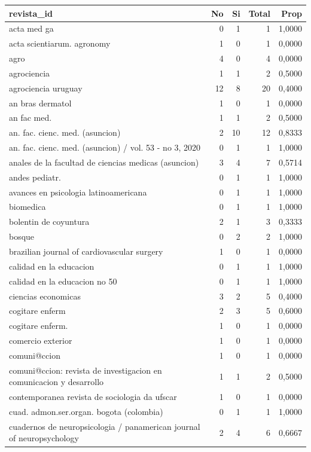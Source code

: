 \begin{longtable}{lrrrr}
\toprule
revista\_id & No & Si & Total & Prop\\
\midrule
acta med ga & 0 & 1 & 1 & 1,0000\\
acta scientiarum. agronomy & 1 & 0 & 1 & 0,0000\\
agro & 4 & 0 & 4 & 0,0000\\
agrociencia & 1 & 1 & 2 & 0,5000\\
agrociencia uruguay & 12 & 8 & 20 & 0,4000\\
an bras dermatol & 1 & 0 & 1 & 0,0000\\
an fac med. & 1 & 1 & 2 & 0,5000\\
an. fac. cienc. med. (asuncion) & 2 & 10 & 12 & 0,8333\\
an. fac. cienc. med. (asuncion) / vol. 53 - no 3, 2020 & 0 & 1 & 1 & 1,0000\\
anales de la facultad de ciencias medicas (asuncion) & 3 & 4 & 7 & 0,5714\\
andes pediatr. & 0 & 1 & 1 & 1,0000\\
avances en psicologia latinoamericana & 0 & 1 & 1 & 1,0000\\
biomedica & 0 & 1 & 1 & 1,0000\\
bolentin de coyuntura & 2 & 1 & 3 & 0,3333\\
bosque & 0 & 2 & 2 & 1,0000\\
brazilian journal of cardiovascular surgery & 1 & 0 & 1 & 0,0000\\
calidad en la educacion & 0 & 1 & 1 & 1,0000\\
calidad en la educacion no 50 & 0 & 1 & 1 & 1,0000\\
ciencias economicas & 3 & 2 & 5 & 0,4000\\
cogitare enferm & 2 & 3 & 5 & 0,6000\\
cogitare enferm. & 1 & 0 & 1 & 0,0000\\
comercio exterior & 1 & 0 & 1 & 0,0000\\
comuni@ccion & 1 & 0 & 1 & 0,0000\\
comuni@ccion: revista de investigacion en comunicacion y desarrollo & 1 & 1 & 2 & 0,5000\\
contemporanea revista de sociologia da ufscar & 1 & 0 & 1 & 0,0000\\
cuad. admon.ser.organ. bogota (colombia) & 0 & 1 & 1 & 1,0000\\
cuadernos de neuropsicologia / panamerican journal of neuropsychology & 2 & 4 & 6 & 0,6667\\

\end{longtable}
